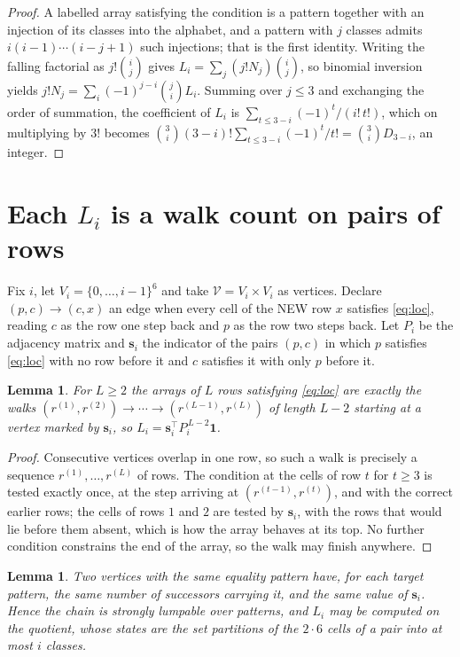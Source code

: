 \documentclass[11pt,a4paper]{article}
\theoremstyle{plain}
\newtheorem{lemma}[theorem]{Lemma}
\theoremstyle{definition}
\begin{document}
\begin{proof}
A labelled array satisfying the condition is a pattern together with an injection of its
classes into the alphabet, and a pattern with $j$ classes admits $i(i-1)\cdots(i-j+1)$ such
injections; that is the first identity. Writing the falling factorial as $j!\binom{i}{j}$
gives $L_i=\sum_j(j!N_j)\binom{i}{j}$, so binomial inversion yields
$j!N_j=\sum_i(-1)^{j-i}\binom{j}{i}L_i$. Summing over $j\le3$ and exchanging the
order of summation, the coefficient of $L_i$ is $\sum_{t\le3-i}(-1)^t/(i!\,t!)$, which on
multiplying by $3!$ becomes
$\binom{3}{i}(3-i)!\sum_{t\le3-i}(-1)^t/t!=\binom{3}{i}D_{3-i}$, an
integer.
\end{proof}

\section{Each $L_i$ is a walk count on pairs of rows}

Fix $i$, let $V_i=\{0,\dots,i-1\}^{6}$ and take $\mathcal V=V_i\times V_i$ as vertices.
Declare $(p,c)\to(c,x)$ an edge when every cell of the NEW row $x$ satisfies
\eqref{eq:loc}, reading $c$ as the row one step back and $p$ as the row two steps
back. Let $P_i$ be the adjacency matrix and $\mathbf{s}_i$ the indicator of the pairs
$(p,c)$ in which $p$ satisfies \eqref{eq:loc} with no row before it and $c$ satisfies it
with only $p$ before it.

\begin{lemma}\label{lem:walk}
For $L\ge2$ the arrays of $L$ rows satisfying \eqref{eq:loc} are exactly the walks
$(r^{(1)},r^{(2)})\to\cdots\to(r^{(L-1)},r^{(L)})$ of length $L-2$ starting at a
vertex marked by $\mathbf{s}_i$, so
$L_i=\mathbf{s}_i^{\!\top}P_i^{\,L-2}\mathbf{1}$.
\end{lemma}

\begin{proof}
Consecutive vertices overlap in one row, so such a walk is precisely a sequence
$r^{(1)},\dots,r^{(L)}$ of rows. The condition at the cells of row $t$ for $t\ge3$
is tested exactly once, at the step arriving at $(r^{(t-1)},r^{(t)})$, and with the
correct earlier rows; the cells of rows $1$ and $2$ are tested by $\mathbf{s}_i$, with
the rows that would lie before them absent, which is how the array behaves at its top. No
further condition constrains the end of the array, so the walk may finish anywhere.
\end{proof}

\begin{lemma}\label{lem:lump}
Two vertices with the same equality pattern have, for each target pattern, the same number of
successors carrying it, and the same value of $\mathbf{s}_i$. Hence the chain is strongly
lumpable over patterns, and $L_i$ may be computed on the quotient, whose states are the set
partitions of the $2\cdot6$ cells of a pair into at most $i$ classes.
\end{lemma}
\end{document}

